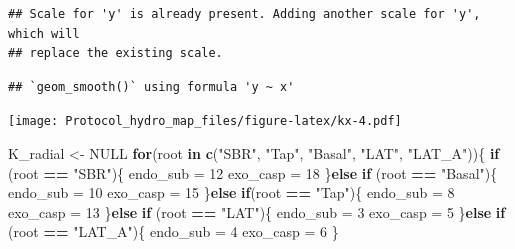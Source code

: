 \documentclass[]{article}
\newenvironment{Shaded}{\begin{snugshade}}{\end{snugshade}}
\newcommand{\KeywordTok}[1]{\textcolor[rgb]{0.13,0.29,0.53}{\textbf{#1}}}
\newcommand{\DecValTok}[1]{\textcolor[rgb]{0.00,0.00,0.81}{#1}}
\newcommand{\StringTok}[1]{\textcolor[rgb]{0.31,0.60,0.02}{#1}}
\newcommand{\OtherTok}[1]{\textcolor[rgb]{0.56,0.35,0.01}{#1}}
\newcommand{\ControlFlowTok}[1]{\textcolor[rgb]{0.13,0.29,0.53}{\textbf{#1}}}
\newcommand{\OperatorTok}[1]{\textcolor[rgb]{0.81,0.36,0.00}{\textbf{#1}}}
\newcommand{\NormalTok}[1]{#1}
\begin{document}
\begin{verbatim}
## Scale for 'y' is already present. Adding another scale for 'y', which will
## replace the existing scale.
\end{verbatim}

\begin{verbatim}
## `geom_smooth()` using formula 'y ~ x'
\end{verbatim}

\texttt{[image: Protocol\_hydro\_map\_files/figure-latex/kx-4.pdf]}

\begin{Shaded}
\begin{Highlighting}[]
\NormalTok{K_radial <-}\StringTok{ }\OtherTok{NULL}
\ControlFlowTok{for}\NormalTok{(root }\ControlFlowTok{in} \KeywordTok{c}\NormalTok{(}\StringTok{"SBR"}\NormalTok{, }\StringTok{"Tap"}\NormalTok{, }\StringTok{"Basal"}\NormalTok{, }\StringTok{"LAT"}\NormalTok{, }\StringTok{"LAT_A"}\NormalTok{))\{}
  \ControlFlowTok{if}\NormalTok{ (root }\OperatorTok{==}\StringTok{ "SBR"}\NormalTok{)\{}
\NormalTok{    endo_sub =}\StringTok{ }\DecValTok{12}
\NormalTok{    exo_casp =}\StringTok{ }\DecValTok{18}
\NormalTok{  \}}\ControlFlowTok{else} \ControlFlowTok{if}\NormalTok{ (root }\OperatorTok{==}\StringTok{ "Basal"}\NormalTok{)\{}
\NormalTok{    endo_sub =}\StringTok{ }\DecValTok{10}
\NormalTok{    exo_casp =}\StringTok{ }\DecValTok{15}
\NormalTok{  \}}\ControlFlowTok{else} \ControlFlowTok{if}\NormalTok{(root }\OperatorTok{==}\StringTok{ "Tap"}\NormalTok{)\{}
\NormalTok{    endo_sub =}\StringTok{ }\DecValTok{8}
\NormalTok{    exo_casp =}\StringTok{ }\DecValTok{13}
\NormalTok{  \}}\ControlFlowTok{else} \ControlFlowTok{if}\NormalTok{ (root }\OperatorTok{==}\StringTok{ "LAT"}\NormalTok{)\{}
\NormalTok{    endo_sub =}\StringTok{ }\DecValTok{3}
\NormalTok{    exo_casp =}\StringTok{ }\DecValTok{5}
\NormalTok{  \}}\ControlFlowTok{else} \ControlFlowTok{if}\NormalTok{ (root }\OperatorTok{==}\StringTok{ "LAT_A"}\NormalTok{)\{}
\NormalTok{    endo_sub =}\StringTok{ }\DecValTok{4}
\NormalTok{    exo_casp =}\StringTok{ }\DecValTok{6}
\NormalTok{  \}}
  

\end{Highlighting}
\end{Shaded}
\end{document}
